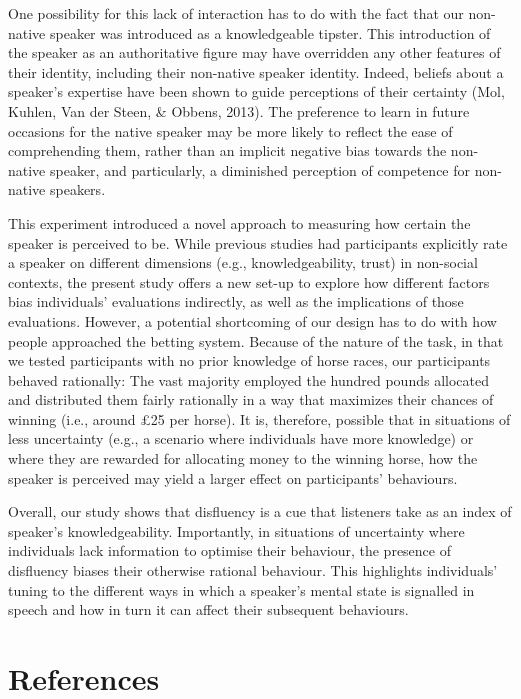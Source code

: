 \documentclass[
  man,floatsintext]{apa7}
\begin{document}
One possibility for this lack of interaction has to do with the fact that our non-native speaker was introduced as a knowledgeable tipster. This introduction of the speaker as an authoritative figure may have overridden any other features of their identity, including their non-native speaker identity. Indeed, beliefs about a speaker's expertise have been shown to guide perceptions of their certainty (Mol, Kuhlen, Van der Steen, \& Obbens, 2013). The preference to learn in future occasions for the native speaker may be more likely to reflect the ease of comprehending them, rather than an implicit negative bias towards the non-native speaker, and particularly, a diminished perception of competence for non-native speakers.

This experiment introduced a novel approach to measuring how certain the speaker is perceived to be. While previous studies had participants explicitly rate a speaker on different dimensions (e.g., knowledgeability, trust) in non-social contexts, the present study offers a new set-up to explore how different factors bias individuals' evaluations indirectly, as well as the implications of those evaluations. However, a potential shortcoming of our design has to do with how people approached the betting system. Because of the nature of the task, in that we tested participants with no prior knowledge of horse races, our participants behaved rationally: The vast majority employed the hundred pounds allocated and distributed them fairly rationally in a way that maximizes their chances of winning (i.e., around £25 per horse). It is, therefore, possible that in situations of less uncertainty (e.g., a scenario where individuals have more knowledge) or where they are rewarded for allocating money to the winning horse, how the speaker is perceived may yield a larger effect on participants' behaviours.

Overall, our study shows that disfluency is a cue that listeners take as an index of speaker's knowledgeability. Importantly, in situations of uncertainty where individuals lack information to optimise their behaviour, the presence of disfluency biases their otherwise rational behaviour. This highlights individuals' tuning to the different ways in which a speaker's mental state is signalled in speech and how in turn it can affect their subsequent behaviours.

\newpage

\hypertarget{references}{%
\section{References}\label{references}}
\end{document}
